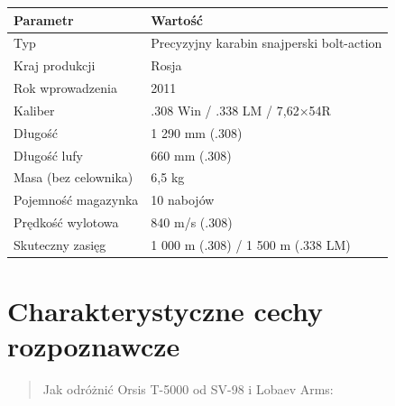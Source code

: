\documentclass[12pt,openany,oneside]{book}
\begin{document}
\begin{longtable}[]{@{}ll@{}}
\toprule\noalign{}
Parametr & Wartość \\
\midrule\noalign{}
\endhead
\bottomrule\noalign{}
\endlastfoot
Typ & Precyzyjny karabin snajperski bolt-action \\
Kraj produkcji & Rosja \\
Rok wprowadzenia & 2011 \\
Kaliber & .308 Win / .338 LM / 7,62×54R \\
Długość & 1 290 mm (.308) \\
Długość lufy & 660 mm (.308) \\
Masa (bez celownika) & 6,5 kg \\
Pojemność magazynka & 10 nabojów \\
Prędkość wylotowa & 840 m/s (.308) \\
Skuteczny zasięg & 1 000 m (.308) / 1 500 m (.338 LM) \\
\end{longtable}

\section{Charakterystyczne cechy
rozpoznawcze}\label{charakterystyczne-cechy-rozpoznawcze-64}

\begin{quote}
Jak odróżnić Orsis T-5000 od SV-98 i Lobaev Arms:
\end{quote}
\end{document}
